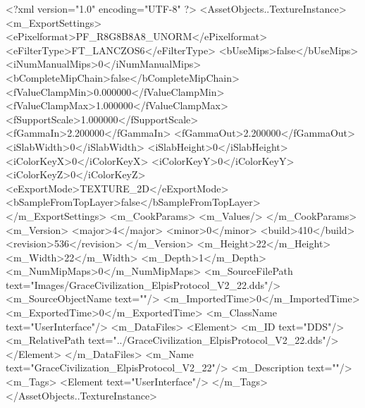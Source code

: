 <?xml version="1.0" encoding="UTF-8" ?>
<AssetObjects..TextureInstance>
	<m_ExportSettings>
		<ePixelformat>PF_R8G8B8A8_UNORM</ePixelformat>
		<eFilterType>FT_LANCZOS6</eFilterType>
		<bUseMips>false</bUseMips>
		<iNumManualMips>0</iNumManualMips>
		<bCompleteMipChain>false</bCompleteMipChain>
		<fValueClampMin>0.000000</fValueClampMin>
		<fValueClampMax>1.000000</fValueClampMax>
		<fSupportScale>1.000000</fSupportScale>
		<fGammaIn>2.200000</fGammaIn>
		<fGammaOut>2.200000</fGammaOut>
		<iSlabWidth>0</iSlabWidth>
		<iSlabHeight>0</iSlabHeight>
		<iColorKeyX>0</iColorKeyX>
		<iColorKeyY>0</iColorKeyY>
		<iColorKeyZ>0</iColorKeyZ>
		<eExportMode>TEXTURE_2D</eExportMode>
		<bSampleFromTopLayer>false</bSampleFromTopLayer>
	</m_ExportSettings>
	<m_CookParams>
		<m_Values/>
	</m_CookParams>
	<m_Version>
		<major>4</major>
		<minor>0</minor>
		<build>410</build>
		<revision>536</revision>
	</m_Version>
	<m_Height>22</m_Height>
	<m_Width>22</m_Width>
	<m_Depth>1</m_Depth>
	<m_NumMipMaps>0</m_NumMipMaps>
	<m_SourceFilePath text="Images/GraceCivilization_ElpisProtocol_V2_22.dds"/>
	<m_SourceObjectName text=""/>
	<m_ImportedTime>0</m_ImportedTime>
	<m_ExportedTime>0</m_ExportedTime>
	<m_ClassName text="UserInterface"/>
	<m_DataFiles>
		<Element>
			<m_ID text="DDS"/>
			<m_RelativePath text="../GraceCivilization_ElpisProtocol_V2_22.dds"/>
		</Element>
	</m_DataFiles>
	<m_Name text="GraceCivilization_ElpisProtocol_V2_22"/>
	<m_Description text=""/>
	<m_Tags>
		<Element text="UserInterface"/>
	</m_Tags>
</AssetObjects..TextureInstance>
